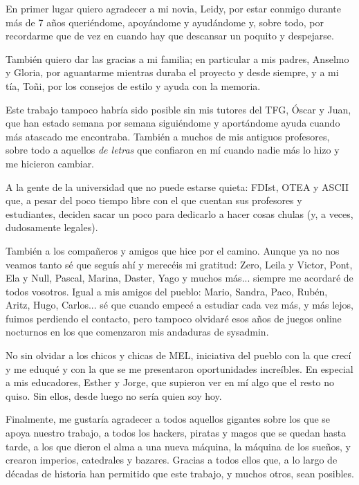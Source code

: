 
En primer lugar quiero agradecer a mi novia, Leidy, por estar conmigo durante más de 7 años queriéndome, apoyándome y ayudándome y, sobre todo, por recordarme que de vez en cuando hay que descansar un poquito y despejarse.

También quiero dar las gracias a mi familia; en particular a mis padres, Anselmo y Gloria, por aguantarme mientras duraba el proyecto y desde siempre, y a mi tía, Toñi, por los consejos de estilo y ayuda con la memoria.

Este trabajo tampoco habría sido posible sin mis tutores del TFG, Óscar y Juan, que han estado semana por semana siguiéndome y aportándome ayuda cuando más atascado me encontraba. También a muchos de mis antiguos profesores, sobre todo a aquellos \textit{de letras} que confiaron en mí cuando nadie más lo hizo y me hicieron cambiar.

A la gente de la universidad que no puede estarse quieta: FDIst, OTEA y ASCII que, a pesar del poco tiempo libre con el que cuentan sus profesores y estudiantes, deciden sacar un poco para dedicarlo a hacer cosas chulas (y, a veces, dudosamente legales).

También a los compañeros y amigos que hice por el camino. Aunque ya no nos veamos tanto sé que seguís ahí y merecéis mi gratitud: Zero, Leila y Victor, Pont, Ela y Null, Pascal, Marina, Daster, Yago y muchos más... siempre me acordaré de todos vosotros. Igual a mis amigos del pueblo: Mario, Sandra, Paco, Rubén, Aritz, Hugo, Carlos... sé que cuando empecé a estudiar cada vez más, y más lejos, fuimos perdiendo el contacto, pero tampoco olvidaré esos años de juegos online nocturnos en los que comenzaron mis andaduras de sysadmin.

No sin olvidar a los chicos y chicas de MEL, iniciativa del pueblo con la que crecí y me eduqué y con la que se me presentaron oportunidades increíbles. En especial a mis educadores, Esther y Jorge, que supieron ver en mí algo que el resto no quiso. Sin ellos, desde luego no sería quien soy hoy.

Finalmente, me gustaría agradecer a todos aquellos gigantes sobre los que se apoya nuestro trabajo, a todos los hackers, piratas y magos que se quedan hasta tarde, a los que dieron el alma a una nueva máquina, la máquina de los sueños, y crearon imperios, catedrales y bazares. Gracias a todos ellos que, a lo largo de décadas de historia han permitido que este trabajo, y muchos otros, sean posibles.